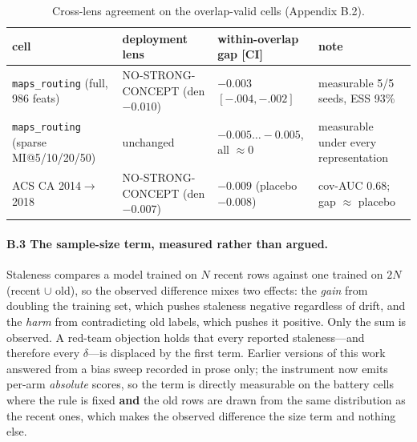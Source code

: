 \documentclass[10pt]{article} %
\begin{document}
\begin{table}[h]
\caption{Cross-lens agreement on the overlap-valid cells (Appendix B.2).}
\label{tab:crosslens}
\centering
\footnotesize
\setlength{\tabcolsep}{4pt}
\begin{tabular}{@{}>{\raggedright\arraybackslash}p{1.72in}>{\raggedright\arraybackslash}p{1.55in}>{\raggedright\arraybackslash}p{1.42in}>{\raggedright\arraybackslash}p{1.32in}@{}}
\toprule
cell & deployment lens & within-overlap gap [CI] & note \\
\midrule
\texttt{maps\_routing} (full, 986 feats) & NO-STRONG-CONCEPT (den $-0.010$) & $-0.003$ $[-.004, -.002]$ & measurable 5/5 seeds, ESS 93\% \\
\texttt{maps\_routing} (sparse MI@5/10/20/50) & unchanged & $-0.005 \ldots -0.005$, all ${\approx}0$ & measurable under every representation \\
ACS CA 2014$\to$2018 & NO-STRONG-CONCEPT (den $-0.007$) & $-0.009$ (placebo $-0.008$) & cov-AUC 0.68; gap $\approx$ placebo \\
\bottomrule
\end{tabular}
\end{table}

\paragraph{B.3 The sample-size term, measured rather than argued.} Staleness compares a model
trained on $N$ recent rows against one trained on $2N$ (recent $\cup$ old), so the observed
difference mixes two effects: the \emph{gain} from doubling the training set, which pushes
staleness negative regardless of drift, and the \emph{harm} from contradicting old labels, which
pushes it positive. Only the sum is observed. A red-team objection holds that every reported
staleness---and therefore every $\delta$---is displaced by the first term. Earlier versions of
this work answered from a bias sweep recorded in prose only; the instrument now emits per-arm
\emph{absolute} scores, so the term is directly measurable on the battery cells where the rule is
fixed \textbf{and} the old rows are drawn from the same distribution as the recent ones, which
makes the observed difference the size term and nothing else.
\end{document}

